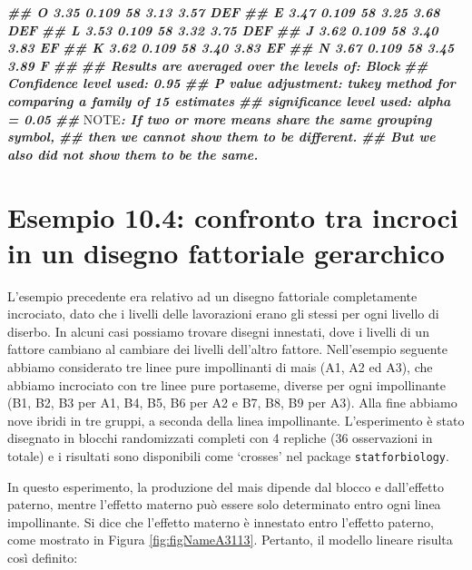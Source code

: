 \documentclass[
  12pt,
]{book}
\newenvironment{Shaded}{\begin{snugshade}}{\end{snugshade}}
\newcommand{\AlertTok}[1]{\textcolor[rgb]{0.94,0.16,0.16}{#1}}
\newcommand{\DocumentationTok}[1]{\textcolor[rgb]{0.56,0.35,0.01}{\textbf{\textit{#1}}}}
\begin{document}
\begin{Shaded}
\begin{Highlighting}[]
\DocumentationTok{\#\#  O          3.35 0.109 58     3.13     3.57     DEF }
\DocumentationTok{\#\#  E          3.47 0.109 58     3.25     3.68     DEF }
\DocumentationTok{\#\#  L          3.53 0.109 58     3.32     3.75     DEF }
\DocumentationTok{\#\#  J          3.62 0.109 58     3.40     3.83      EF }
\DocumentationTok{\#\#  K          3.62 0.109 58     3.40     3.83      EF }
\DocumentationTok{\#\#  N          3.67 0.109 58     3.45     3.89       F }
\DocumentationTok{\#\# }
\DocumentationTok{\#\# Results are averaged over the levels of: Block }
\DocumentationTok{\#\# Confidence level used: 0.95 }
\DocumentationTok{\#\# P value adjustment: tukey method for comparing a family of 15 estimates }
\DocumentationTok{\#\# significance level used: alpha = 0.05 }
\DocumentationTok{\#\# }\AlertTok{NOTE}\DocumentationTok{: If two or more means share the same grouping symbol,}
\DocumentationTok{\#\#       then we cannot show them to be different.}
\DocumentationTok{\#\#       But we also did not show them to be the same.}
\end{Highlighting}
\end{Shaded}

\hypertarget{esempio-10.4-confronto-tra-incroci-in-un-disegno-fattoriale-gerarchico}{%
\section{Esempio 10.4: confronto tra incroci in un disegno fattoriale gerarchico}\label{esempio-10.4-confronto-tra-incroci-in-un-disegno-fattoriale-gerarchico}}

L'esempio precedente era relativo ad un disegno fattoriale completamente incrociato, dato che i livelli delle lavorazioni erano gli stessi per ogni livello di diserbo. In alcuni casi possiamo trovare disegni innestati, dove i livelli di un fattore cambiano al cambiare dei livelli dell'altro fattore. Nell'esempio seguente abbiamo considerato tre linee pure impollinanti di mais (A1, A2 ed A3), che abbiamo incrociato con tre linee pure portaseme, diverse per ogni impollinante (B1, B2, B3 per A1, B4, B5, B6 per A2 e B7, B8, B9 per A3). Alla fine abbiamo nove ibridi in tre gruppi, a seconda della linea impollinante. L'esperimento è stato disegnato in blocchi randomizzati completi con 4 repliche (36 osservazioni in totale) e i risultati sono disponibili come `crosses' nel package \texttt{statforbiology}.

In questo esperimento, la produzione del mais dipende dal blocco e dall'effetto paterno, mentre l'effetto materno può essere solo determinato entro ogni linea impollinante. Si dice che l'effetto materno è innestato entro l'effetto paterno, come mostrato in Figura \ref{fig:figNameA3113}. Pertanto, il modello lineare risulta così definito:
\end{document}
